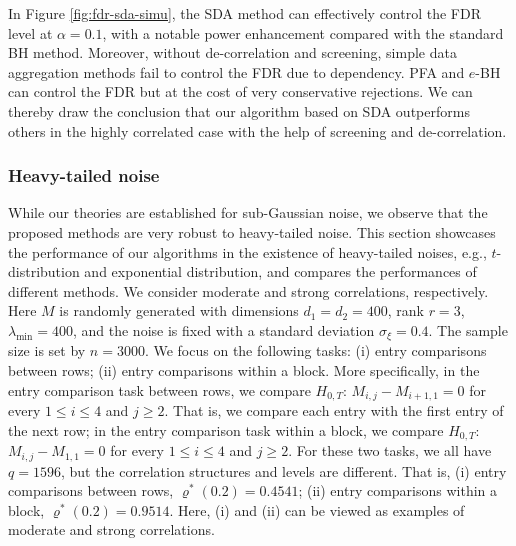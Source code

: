 \documentclass[12pt]{article}
\theoremstyle{plain}
\begin{document}
\begin{sloppypar}
In Figure \ref{fig:fdr-sda-simu}, the SDA method can effectively control the FDR level at $\alpha=0.1$, with a notable power enhancement compared with the standard BH method. Moreover, without de-correlation and screening, simple data aggregation methods fail to control the FDR due to dependency. PFA and $e$-BH can control the FDR but at the cost of very conservative rejections.
We can thereby draw the conclusion that our algorithm based on SDA outperforms others in the highly correlated case with the help of screening and de-correlation. 

\subsubsection{Heavy-tailed noise}
While our theories are established for sub-Gaussian noise, we observe that the proposed methods are very robust to heavy-tailed noise. This section showcases the performance of our algorithms in the existence of heavy-tailed noises, e.g., $t$-distribution and exponential distribution, and compares the performances of different methods. We consider moderate and strong correlations, respectively. Here $M$ is randomly generated with dimensions $d_1=d_2=400$, rank $r=3$, $\lambda_{\min}=400$, and the noise is fixed with a standard deviation $\sigma_\xi=0.4$. The sample size is set by $n=3000$. We focus on the following tasks: (i) entry comparisons between rows; (ii) entry comparisons within a block. More specifically, in the entry comparison task between rows, we compare $H_{0,T}$: $M_{i,j}-M_{i+1,1}=0$ for every $1\le i\le 4$ and $j\ge 2$. That is, we compare each entry with the first entry of the next row; in the entry comparison task within a block, we compare $H_{0,T}$: $M_{i,j}-M_{1,1}=0$ for every  $1\le i\le 4$ and $j\ge 2$. For these two tasks, we all have $q=1596$, but the correlation structures and levels are different. That is, (i) entry comparisons between rows, $\varrho^*(0.2)=0.4541$; (ii) entry comparisons within a block, $\varrho^*(0.2)=0.9514$. Here, (i) and (ii) can be viewed as examples of moderate and strong correlations.


\end{sloppypar}
\end{document}
